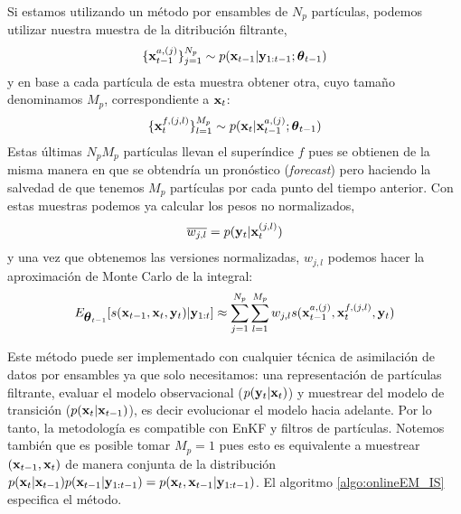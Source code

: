 Si estamos utilizando un método por ensambles de $N_p$ partículas, podemos utilizar nuestra muestra de la ditribución filtrante,
\begin{align*}
    \{ \mathbf{x}_{t-1}^{a, (j)}\}_{j=1}^{N_p} \sim p(\mathbf{x}_{t-1} | \mathbf{y}_{1:t-1} ; \mbox{\boldmath$ \theta $}_{t-1})
\end{align*}
y en base a cada partícula de esta muestra obtener otra, cuyo tamaño denominamos $M_p$, correspondiente a $\mathbf{x}_t$:
\begin{align*}
    \{ \mathbf{x}_{t}^{f, (j,l)}\}_{l=1}^{M_p} \sim p(\mathbf{x}_t | \mathbf{x}_{t-1}^{a, (j)} ; \mbox{\boldmath$ \theta $}_{t-1})
\end{align*}
Estas últimas $N_p M_p$ partículas llevan el superíndice $f$ pues se obtienen de la misma manera en que se obtendría un pronóstico (\textit{forecast}) pero haciendo la salvedad de que tenemos $M_p$ partículas por cada punto del tiempo anterior. Con estas muestras podemos ya calcular los pesos no normalizados,
\begin{align*}
    \overline{w_{j,l}} = p(\mathbf{y}_t | \mathbf{x}_t^{(j,l)})
\end{align*}
y una vez que obtenemos las versiones normalizadas, $w_{j,l}$ podemos hacer la aproximación de Monte Carlo de la integral:
\begin{align*}
    E_{\mbox{\boldmath$ \theta $}_{t-1}} [s(\mathbf{x}_{t-1}, \mathbf{x}_t, \mathbf{y}_t) | \mathbf{y}_{1:t}] \approx \sum_{j=1}^{N_p} \sum_{l=1}^{M_p} w_{j, l} s(\mathbf{x}_{t-1}^{a, (j)}, \mathbf{x}_{t}^{f, (j,l)}, \mathbf{y}_t)
\end{align*}

Este método puede ser implementado con cualquier técnica de asimilación de datos por ensambles ya que solo necesitamos: una representación de partículas filtrante, evaluar el modelo observacional ($p(\mathbf{y}_t | \mathbf{x}_t)$) y muestrear del modelo de transición ($p(\mathbf{x}_t | \mathbf{x}_{t-1})$), es decir evolucionar el modelo hacia adelante. Por lo tanto, la metodología es compatible con EnKF y filtros de partículas. Notemos también que  es posible tomar $M_p = 1$ pues esto es equivalente a muestrear $(\mathbf{x}_{t-1}, \mathbf{x}_t)$ de manera conjunta de la distribución $p(\mathbf{x}_t | \mathbf{x}_{t-1}) p(\mathbf{x}_{t-1} | \mathbf{y}_{1:t-1}) = p(\mathbf{x}_t, \mathbf{x}_{t-1} | \mathbf{y}_{1:t-1})$. El algoritmo \ref{algo:onlineEM_IS} especifica el método.

